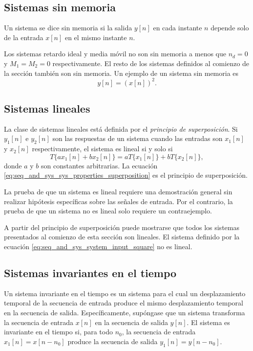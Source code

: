 \documentclass[a4paper]{report}
\begin{document}
\subsection{Sistemas sin memoria}
 
Un sistema se dice sin memoria si la salida \(y[n]\) en cada instante \(n\) depende solo de la entrada \(x[n]\) en el mismo instante \(n\). 

Los sistemas retardo ideal y media móvil no son sin memoria a menos que \(n_d=0\) y \(M_1=M_2=0\) respectivamente. El resto de los sistemas definidos al comienzo de la sección también son sin memoria. Un ejemplo de un sistema sin memoria es
\begin{equation}\label{eq:seq_and_sys_system_input_square}
 y[n]=(x[n])^2. 
\end{equation}

\subsection{Sistemas lineales}

La clase de sistemas lineales está definida por el \emph{principio de superposición}. Si \(y_1[n]\) e \(y_2[n]\) son las respuestas de un sistema cuando las entradas son \(x_1[n]\) y \(x_2[n]\) respectivamente, el sistema es lineal si y solo si
\begin{equation}\label{eq:seq_and_sys_sys_properties_superposition}
 T\{ax_1[n]+bx_2[n]\}=aT\{x_1[n]\}+bT\{x_2[n]\}, 
\end{equation}
donde \(a\) y \(b\) son constantes arbitrarias. La ecuación \ref{eq:seq_and_sys_sys_properties_superposition} es el principio de superposición.

La prueba de que un sistema es lineal requiere una demostración general sin realizar hipótesis específicas sobre las señales de entrada. Por el contrario, la prueba de que un sistema no es lineal solo requiere un contraejemplo. 

A partir del principio de superposición puede mostrarse que todos los sistemas presentados al comienzo de esta sección son lineales. El sistema definido por la ecuación \ref{eq:seq_and_sys_system_input_square} no es lineal.

\subsection{Sistemas invariantes en el tiempo} 
 
Un sistema invariante en el  tiempo es un sistema para el cual un desplazamiento temporal de la secuencia de entrada produce el mismo desplazamiento temporal en la secuencia de salida. Específicamente, supóngase que un sistema transforma la secuencia de entrada \(x[n]\) en la secuencia de salida \(y[n]\). El sistema es invariante en el tiempo si, para todo \(n_0\), la secuencia de entrada \(x_1[n]=x[n-n_0]\) produce la secuencia de salida \(y_1[n]=y[n-n_0]\). 
\end{document}
